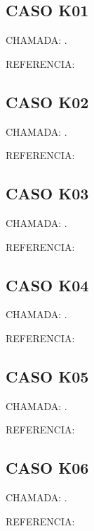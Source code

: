 \documentclass{undftex}
\begin{document}
\begin{refsection}\section*{CASO K01} CHAMADA: . \textcite{v25}\par REFERENCIA:\par\printbibliography[heading=none,check=undfconsultadas]\end{refsection}\clearpage
\begin{refsection}\section*{CASO K02} CHAMADA: . \textcite{brasil1996ldb}\par REFERENCIA:\par\printbibliography[heading=none,check=undfconsultadas]\end{refsection}\clearpage
\begin{refsection}\section*{CASO K03} CHAMADA: . \textcite{k03}\par REFERENCIA:\par\printbibliography[heading=none,check=undfconsultadas]\end{refsection}\clearpage
\begin{refsection}\section*{CASO K04} CHAMADA: . \textcite{k04}\par REFERENCIA:\par\printbibliography[heading=none,check=undfconsultadas]\end{refsection}\clearpage
\begin{refsection}\section*{CASO K05} CHAMADA: . \textcite{k05}\par REFERENCIA:\par\printbibliography[heading=none,check=undfconsultadas]\end{refsection}\clearpage
\begin{refsection}\section*{CASO K06} CHAMADA: . \textcite{k06}\par REFERENCIA:\par\printbibliography[heading=none,check=undfconsultadas]\end{refsection}\clearpage
\end{document}
